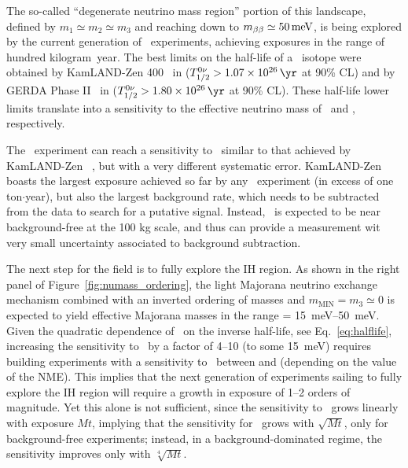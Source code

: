 The so-called ``degenerate neutrino mass region'' portion of this landscape, defined by $m_1\simeq m_2\simeq m_3$ and reaching down to $\mbb \simeq \SI{50}{\meV}$, is being explored by the current generation of \bbonu\ experiments, achieving exposures in the range of hundred kilogram~year. 
The best limits on the half-life of a \bbonu\ isotope were obtained by KamLAND-Zen 400~\cite{KamLAND-Zen:2016pfg} in  ($\Tonu > \KZenTz$ at 90\% CL) and by GERDA Phase II~\cite{GERDA:2020xhi} in  ($\Tonu > \GerdaTz$ at 90\% CL). These half-life lower limits translate into a sensitivity to the effective neutrino mass of \KZenMbb\ and \GerdaMbb, respectively. 

\indent

The \Next\ experiment can reach a sensitivity to \Tonu\ similar to that achieved by  KamLAND-Zen ~\cite{Martin-Albo:2015rhw}, but with a very different systematic error. KamLAND-Zen boasts the largest exposure achieved so far by any \bbonu\ experiment (in excess of one ton$\cdot$year), but also the largest background rate, which needs to be subtracted from the data to search for a putative signal. Instead, \Next\ is expected to be near background-free at the 100 kg scale, and thus can provide a measurement wit very small uncertainty associated to background subtraction. 
 
The next step for the field is to fully explore the IH region. As shown in the right panel of Figure~\ref{fig:numass_ordering}, the light Majorana neutrino exchange mechanism combined with an inverted ordering of masses and $m_\mathrm{MIN}=m_3\simeq 0$ is expected to yield effective Majorana masses in the range \mbb = \SIrange{15}{50}{\meV}. Given the quadratic dependence of \mbb\ on the inverse half-life, see Eq.~\ref{eq:halflife}, increasing the sensitivity to \mbb\ by a factor of 4--10 (to some \SI{15}{\meV}) requires building experiments with a sensitivity to \Tonu\ between \IHTzl \; and  \IHTz \;  (depending on the value of the NME). This implies that the next generation of experiments sailing to fully explore the IH region will require a growth in exposure of 1--2 orders of magnitude.  Yet this alone is not sufficient, since the sensitivity to \Tonu\ grows linearly with exposure $Mt$, implying that the sensitivity for \mbb\ grows with $\sqrt{Mt}$, only for background-free experiments; instead, in a background-dominated regime, the sensitivity improves only with $\sqrt[4]{Mt}$.

